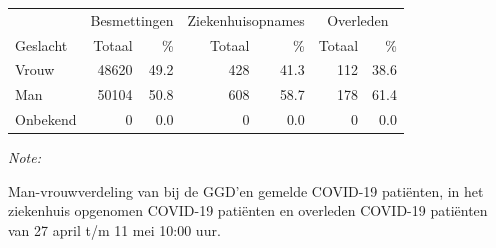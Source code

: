 \documentclass[
  english,
  man,floatsintext]{apa6}
\begin{document}
\begin{table}
\centering\begingroup\fontsize{11}{13}\selectfont

\begin{threeparttable}
\begin{tabular}{lrrrrrr}
\toprule
\multicolumn{1}{c}{ } & \multicolumn{2}{c}{Besmettingen} & \multicolumn{2}{c}{Ziekenhuisopnames} & \multicolumn{2}{c}{Overleden} \\
\cmidrule(l{3pt}r{3pt}){2-3} \cmidrule(l{3pt}r{3pt}){4-5} \cmidrule(l{3pt}r{3pt}){6-7}
Geslacht & Totaal & \% & Totaal & \% & Totaal & \%\\
\midrule
Vrouw & 48620 & 49.2 & 428 & 41.3 & 112 & 38.6\\
Man & 50104 & 50.8 & 608 & 58.7 & 178 & 61.4\\
Onbekend & 0 & 0.0 & 0 & 0.0 & 0 & 0.0\\
\bottomrule
\end{tabular}
\begin{tablenotes}
\item \textit{Note: } 
\item Man-vrouwverdeling van bij de GGD’en gemelde COVID-19 patiënten, in het ziekenhuis opgenomen COVID-19 patiënten en overleden COVID-19 patiënten van 27 april t/m 11 mei 10:00 uur.
\end{tablenotes}
\end{threeparttable}
\endgroup{}
\end{table}
\newpage
\end{document}

